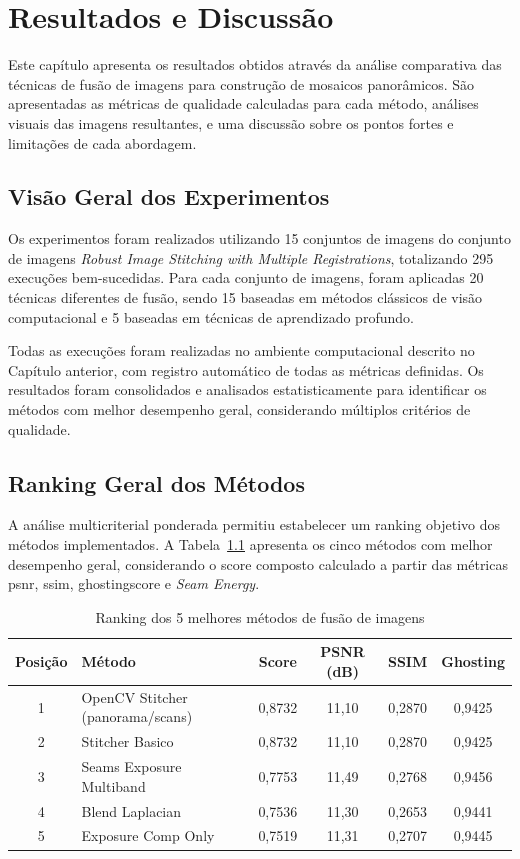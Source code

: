 \chapter{Resultados e Discussão}

Este capítulo apresenta os resultados obtidos através da análise comparativa das técnicas de fusão de imagens para construção de mosaicos panorâmicos. São apresentadas as métricas de qualidade calculadas para cada método, análises visuais das imagens resultantes, e uma discussão sobre os pontos fortes e limitações de cada abordagem.

\section{Visão Geral dos Experimentos}

Os experimentos foram realizados utilizando 15 conjuntos de imagens do conjunto de imagens \textit{Robust Image Stitching with Multiple Registrations}, totalizando 295 execuções bem-sucedidas. Para cada conjunto de imagens, foram aplicadas 20 técnicas diferentes de fusão, sendo 15 baseadas em métodos clássicos de visão computacional e 5 baseadas em técnicas de aprendizado profundo.

Todas as execuções foram realizadas no ambiente computacional descrito no Capítulo anterior, com registro automático de todas as métricas definidas. Os resultados foram consolidados e analisados estatisticamente para identificar os métodos com melhor desempenho geral, considerando múltiplos critérios de qualidade.

\section{Ranking Geral dos Métodos}

A análise multicriterial ponderada permitiu estabelecer um ranking objetivo dos métodos implementados. A Tabela~\ref{tab:top5} apresenta os cinco métodos com melhor desempenho geral, considerando o score composto calculado a partir das métricas \gls{psnr}, \gls{ssim}, \gls{ghostingscore} e \textit{Seam Energy}.

\begin{table}[htb]
\centering
\caption{Ranking dos 5 melhores métodos de fusão de imagens}
\label{tab:top5}
\small
\begin{tabular}{clcccc}
\hline
\textbf{Posição} & \textbf{Método} & \textbf{Score} & \textbf{PSNR (dB)} & \textbf{SSIM} & \textbf{Ghosting} \\ \hline
1 & OpenCV Stitcher (panorama/scans) & 0,8732 & 11,10 & 0,2870 & 0,9425 \\
2 & Stitcher Basico & 0,8732 & 11,10 & 0,2870 & 0,9425 \\
3 & Seams Exposure Multiband & 0,7753 & 11,49 & 0,2768 & 0,9456 \\
4 & Blend Laplacian & 0,7536 & 11,30 & 0,2653 & 0,9441 \\
5 & Exposure Comp Only & 0,7519 & 11,31 & 0,2707 & 0,9445 \\
\hline
\end{tabular}
\end{table}

